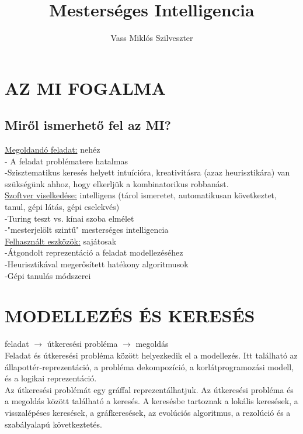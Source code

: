 \documentclass{article}
\begin{document}
	
	\title{Mesterséges Intelligencia}
	\author{Vass Miklós Szilveszter}
	
	\section{AZ MI FOGALMA}
	\subsection{Miről ismerhető fel az MI?}
	\underline{Megoldandó feladat:} nehéz\\
	- A feladat problématere hatalmas\\	
	-Szisztematikus keresés helyett intuícióra, kreativitásra (azaz heurisztikára) van szükségünk ahhoz, hogy elkerljük a kombinatorikus robbanást.\\
	\underline{Szoftver viselkedése:} intelligens (tárol ismeretet, automatikusan következtet, tanul, gépi látás, gépi cselekvés)\\
	-Turing teszt vs. kínai szoba elmélet\\
	-"mesterjelölt szintű" mesterséges intelligencia\\
	\underline{Felhasznált eszközök:} sajátosak\\
	-Átgondolt reprezentáció a feladat modellezéséhez\\
	-Heurisztikával megerősített hatékony algoritmusok\\
	-Gépi tanulás módszerei\\
	
	\section{MODELLEZÉS ÉS KERESÉS}
	feladat $\rightarrow$ útkeresési probléma $\rightarrow$ megoldás\\
	Feladat és útkeresési probléma között helyezkedik el a modellezés. Itt található az állapottér-reprezentáció, a probléma dekompozíció, a korlátprogramozási modell, és a logikai reprezentáció.\\
	Az útkeresési problémát egy gráffal reprezentálhatjuk.
	Az útkeresési probléma és a megoldás között található a keresés. A keresésbe tartoznak a lokális keresések, a visszalépéses keresések, a gráfkeresések, az evolúciós algoritmus, a rezolúció és a szabályalapú következtetés.\\
	
\end{document}
